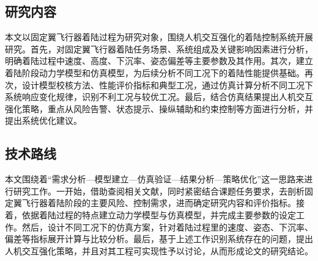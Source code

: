 \subsection{研究内容}
本文以固定翼飞行器着陆过程为研究对象，围绕人机交互强化的着陆控制系统开展研究。首先，对固定翼飞行器着陆任务场景、系统组成及关键影响因素进行分析，明确着陆过程中速度、高度、下沉率、姿态偏差等主要参数及其作用。其次，建立着陆阶段动力学模型和仿真模型，为后续分析不同工况下的着陆性能提供基础。再次，设计模型校核方法、性能评价指标和典型工况，通过仿真计算分析不同工况下系统响应变化规律，识别不利工况与较优工况。最后，结合仿真结果提出人机交互强化策略，重点从风险告警、状态提示、操纵辅助和约束控制等方面进行分析，并提出系统优化建议。
\subsection{技术路线}
本文围绕着``需求分析---模型建立---仿真验证---结果分析---策略优化''这一思路来进行研究工作。一开始，借助查阅相关文献，同时紧密结合课题任务要求，去剖析固定翼飞行器着陆阶段的主要风险、控制需求，进而确定研究内容和评价指标。接着，依据着陆过程的特点建立动力学模型与仿真模型，并完成主要参数的设定工作。然后，设计不同工况下的仿真方案，针对着陆过程里的速度、姿态、下沉率、偏差等指标展开计算与比较分析。最后，基于上述工作识别系统存在的问题，提出人机交互强化策略，并且对其工程可实现性予以讨论，从而形成论文的研究结论。
